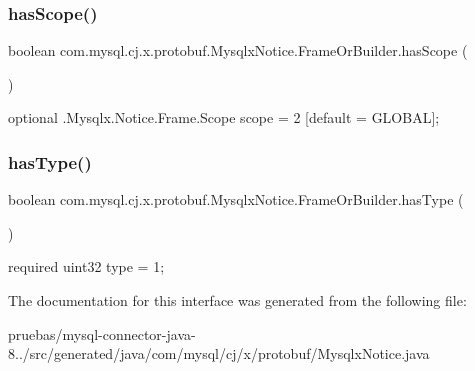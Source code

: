 \subsubsection{\texorpdfstring{has\+Scope()}{hasScope()}}
{\footnotesize\ttfamily boolean com.\+mysql.\+cj.\+x.\+protobuf.\+Mysqlx\+Notice.\+Frame\+Or\+Builder.\+has\+Scope (\begin{DoxyParamCaption}{ }\end{DoxyParamCaption})}

{\ttfamily optional .Mysqlx.\+Notice.\+Frame.\+Scope scope = 2 \mbox{[}default = G\+L\+O\+B\+AL\mbox{]};} \mbox{\label{interfacecom_1_1mysql_1_1cj_1_1x_1_1protobuf_1_1_mysqlx_notice_1_1_frame_or_builder_a7e4eaabcca9c9483a0200a69dab53527}} 
\subsubsection{\texorpdfstring{has\+Type()}{hasType()}}
{\footnotesize\ttfamily boolean com.\+mysql.\+cj.\+x.\+protobuf.\+Mysqlx\+Notice.\+Frame\+Or\+Builder.\+has\+Type (\begin{DoxyParamCaption}{ }\end{DoxyParamCaption})}

{\ttfamily required uint32 type = 1;} 

The documentation for this interface was generated from the following file\+:\begin{DoxyCompactItemize}
\item 
pruebas/mysql-\/connector-\/java-\/8../src/generated/java/com/mysql/cj/x/protobuf/Mysqlx\+Notice.\+java\end{DoxyCompactItemize}
